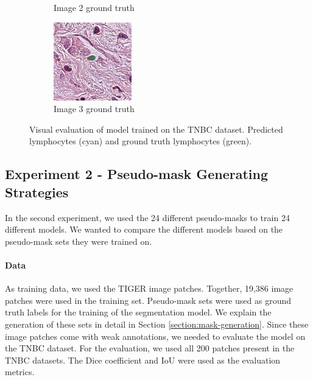 \begin{figure}[H]
\begin{subfigure}[b]{0.32\textwidth}
    \caption{Image 2 ground truth}
  \end{subfigure}\hfill
  \begin{subfigure}[b]{0.32\textwidth}
    \centering
    \includegraphics[width=\linewidth]{assets/images/for_presentation/exp1-3-gt.png}
    \caption{Image 3 ground truth}
  \end{subfigure}
  \caption{Visual evaluation of model trained on the TNBC dataset. Predicted lymphocytes (cyan) and ground truth lymphocytes (green).}
  \label{fig:exp1-results}
\end{figure}

\subsection{Experiment 2 - Pseudo-mask Generating Strategies}
\label{sub:exp-2}
In the second experiment, we used the 24 different pseudo-masks to train 24 different models. We wanted to compare the different models based on the pseudo-mask sets they were trained on.

\paragraph{Data}
As training data, we used the TIGER image patches. Together, 19,386 image patches were used in the training set. Pseudo-mask sets were used as ground truth labels for the training of the segmentation model. We explain the generation of these sets in detail in Section \ref{section:mask-generation}. Since these image patches come with weak annotations, we needed to evaluate the model on the TNBC dataset. For the evaluation, we used all 200 patches present in the TNBC datasets. The Dice coefficient and IoU were used as the evaluation metrics.

